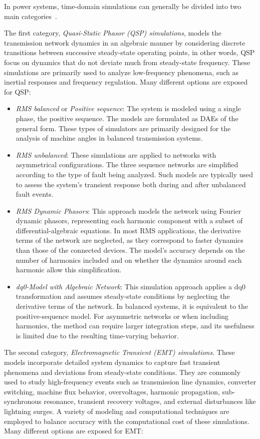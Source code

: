 In power systems, time-domain simulations can generally be divided into two main categories~\cite{LaraTDS}. 

The first category, \textit{Quasi-Static Phasor (QSP) simulations}, models the transmission network dynamics in an algebraic manner by considering discrete transitions
between successive steady-state operating points, in other words, QSP focus on dynamics that do not deviate much from steady-state frequency.
These simulations are primarily used to analyze low-frequency phenomena, such as inertial responses and frequency regulation. 
Many different options are exposed for QSP:

\begin{itemize}
    \item \textit{RMS balanced} or \textit{Positive sequence}: The system is modeled using a single phase, the positive sequence. The models are formulated as DAEs of the general form.
     These types of simulators are primarily designed for the analysis of machine angles in balanced transmission systems. 
    \item \textit{RMS unbalanced}: These simulations are applied to networks with asymmetrical configurations. The three sequence networks are simplified according to the type 
    of fault being analyzed. Such models are typically used to assess the system's transient response both during and after unbalanced fault events.
    \item \textit{RMS Dynamic Phasors}: This approach models the network using Fourier dynamic phasors, representing each harmonic component with a subset of differential-algebraic equations. 
    In most RMS applications, the derivative terms of the network are neglected, as they correspond to faster dynamics than those of the connected devices. 
    The model's accuracy depends on the number of harmonics included and on whether the dynamics around each harmonic allow this simplification.
    \item \textit{dq0-Model with Algebraic Network}: This simulation approach applies a dq0 transformation and assumes steady-state conditions by neglecting the derivative terms
     of the network. In balanced systems, it is equivalent to the positive-sequence model. For asymmetric networks or when including harmonics, the method can require larger
     integration steps, and its usefulness is limited due to the resulting time-varying behavior.
\end{itemize}


The second category, \textit{Electromagnetic Transient (EMT) simulations}. These models incorporate detailed system dynamics to capture fast transient phenomena and deviations 
from steady-state conditions. They are commonly used to study high-frequency events such as transmission line dynamics, converter switching, machine flux behavior, 
overvoltages, harmonic propagation, sub-synchronous resonance, transient recovery voltages, and external disturbances like lightning surges. 
A variety of modeling and computational techniques are employed to balance accuracy with the computational cost of these simulations.
Many different options are exposed for EMT:

